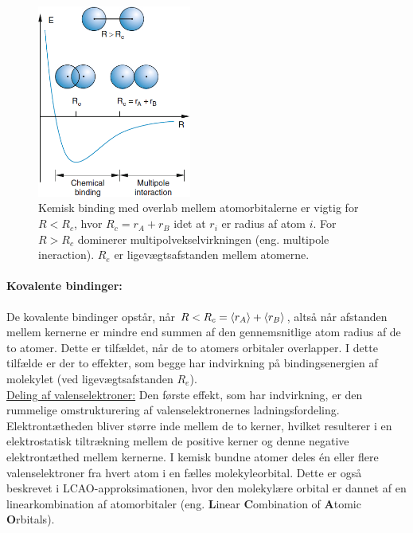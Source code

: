 \begin{figure}[!h]
    \centering
    \includegraphics[width=0.45\textwidth]{Q19/images/ReasonsForBinding.PNG}
    \caption{Kemisk binding med overlab mellem atomorbitalerne er vigtig for $R < R_c$, hvor $R_c = r_A + r_B$ idet at $r_i$ er radius af atom $i$. For $R > R_c$ dominerer multipolvekselvirkningen (eng. multipole ineraction). $R_e$ er ligevægtsafstanden mellem atomerne.}
    \label{fig:Q19_ReasonsForMolecularBinding}
\end{figure}


\paragraph{Kovalente bindinger:} De kovalente bindinger opstår, når $R < R_c = \Braket{r_A} + \Braket{r_B}$, altså når afstanden mellem kernerne er mindre end summen af den gennemsnitlige atom radius af de to atomer. Dette er tilfældet, når de to atomers orbitaler overlapper. I dette tilfælde er der to effekter, som begge har indvirkning på bindingsenergien af molekylet (ved ligevægtsafstanden $R_e$).\\

\underline{Deling af valenselektroner:} Den første effekt, som har indvirkning, er den rummelige omstrukturering af valenselektronernes ladningsfordeling. Elektrontætheden bliver større inde mellem de to kerner, hvilket resulterer i en elektrostatisk tiltrækning mellem de positive kerner og denne negative elektrontæthed mellem kernerne. I kemisk bundne atomer deles én eller flere valenselektroner fra hvert atom i en fælles molekyleorbital. Dette er også beskrevet i \textsf{LCAO-approksimationen}, hvor den molekylære orbital er dannet af en linearkombination af atomorbitaler (eng. \textbf{L}inear \textbf{C}ombination of \textbf{A}tomic \textbf{O}rbitals).\\

